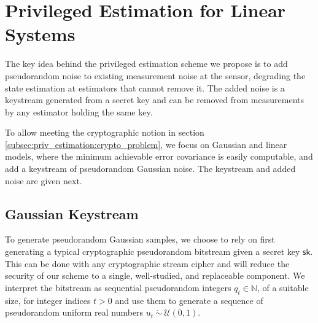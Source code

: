 \section{Privileged Estimation for Linear Systems}\label{sec:priv_estimation:privileged_estimation}


The key idea behind the privileged estimation scheme we propose is to add pseudorandom noise to existing measurement noise at the sensor, degrading the state estimation at estimators that cannot remove it. The added noise is a keystream generated from a secret key and can be removed from measurements by any estimator holding the same key.

To allow meeting the cryptographic notion in section \ref{subsec:priv_estimation:crypto_problem}, we focus on Gaussian and linear models, where the minimum achievable error covariance is easily computable, and add a keystream of pseudorandom Gaussian noise. The keystream and added noise are given next.

% 
% 

\subsection{Gaussian Keystream}\label{subsec:priv_estimation:est_gaussian_keystream}
To generate pseudorandom Gaussian samples, we choose to rely on first generating a typical cryptographic pseudorandom bitstream given a secret key $\mathsf{sk}$. This can be done with any cryptographic stream cipher and will reduce the security of our scheme to a single, well-studied, and replaceable component. We interpret the bitstream as sequential pseudorandom integers $q_t \in \mathbb{N}$, of a suitable size, for integer indices $t>0$ and use them to generate a sequence of pseudorandom uniform real numbers $u_t\ \dot{\sim}\ \mathcal{U}(0,1)$.

